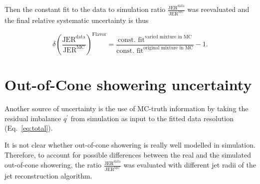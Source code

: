 Then the constant fit to the data to simulation ratio $\frac{\text{JER}^{\text{data}}}{\text{JER}^{\text{MC}}}$ was reevaluated and 
the final relative systematic uncertainty is thus 

\begin{equation}
\label{FlavorUncFINAL}
\delta \left( \frac{\text{JER}^{\text{data}}}{\text{JER}^{\text{MC}}} \right)^{\text{Flavor}} = \frac{\text{const. fit}^{\text{varied mixture in MC}}}{\text{const. fit}^{\text{original mixture in MC}}} - 1.
\end{equation}

\section*{Out-of-Cone showering uncertainty}
Another source of uncertainty is the use of MC-truth information by taking the residual imbalance $q^{\prime}$ from simulation as input to the fitted data resolution 
\mbox{(Eq.~\eqref{eq:total})}.

It is not clear whether out-of-cone showering is really well modelled in simulation. 
Therefore, to account for possible differences between the real and the simulated out-of-cone showering, the ratio $\frac{\text{JER}^{\text{data}}}{\text{JER}^{\text{MC}}}$ 
was evaluated with different jet radii of the jet reconstruction algorithm. 

